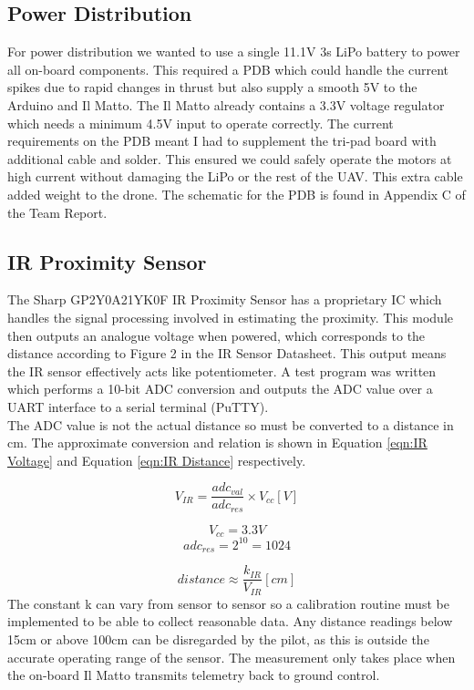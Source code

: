 \documentclass[a4paper,11pt]{article}
\begin{document}
\subsection{Power Distribution}
For power distribution we wanted to use a single 11.1V 3s LiPo battery to power all on-board components. This required a PDB which could handle the current spikes due to rapid changes in thrust but also supply a smooth 5V to the Arduino and Il Matto. The Il Matto already contains a 3.3V voltage regulator which needs a minimum 4.5V input to operate correctly. The current requirements on the PDB meant I had to supplement the tri-pad board with additional cable and solder. This ensured we could safely operate the motors at high current without damaging the LiPo or the rest of the UAV. This extra cable added weight to the drone. The schematic for the PDB is found in Appendix C of the Team Report.

\subsection{IR Proximity Sensor}
The Sharp GP2Y0A21YK0F IR Proximity Sensor has a proprietary IC which handles the signal processing involved in estimating the proximity. This module then outputs an analogue voltage when powered, which corresponds to the distance according to Figure 2 in the IR Sensor Datasheet\cite{IR Sensor Datasheet}. This output means the IR sensor effectively acts like potentiometer. A test program was written which performs a 10-bit ADC conversion and outputs the ADC value over a UART interface to a serial terminal (PuTTY).\\ The ADC value is not the actual distance so must be converted to a distance in cm. The approximate conversion and relation is shown in Equation \ref{eqn:IR Voltage} and Equation \ref{eqn:IR Distance} respectively.

\begin{equation}
V_{IR} = \frac{adc_{val}}{adc_{res}}\times V_{cc} [V]
\label{eqn:IR Voltage}
\end{equation}

\[V_{cc} = 3.3V\]
\[adc_{res} = 2^{10} = 1024\]

\begin{equation}
distance \approx \frac{k_{IR}}{V_{IR}} [cm]
\label{eqn:IR Distance}
\end{equation}
The constant k can vary from sensor to sensor so a calibration routine must be implemented to be able to collect reasonable data. Any distance readings below 15cm or above 100cm can be disregarded by the pilot, as this is outside the accurate operating range of the sensor. The measurement only takes place when the on-board Il Matto transmits telemetry back to ground control.
\end{document}
